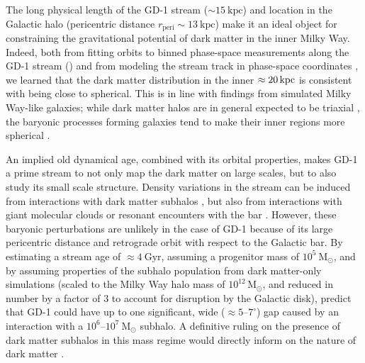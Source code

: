 \documentclass[modern]{aastex62}
\newcommand{\msun}{\textrm{M}_\odot}
\newcommand{\kpc}{\textrm{kpc}}
\begin{document}
The long physical length of the GD-1 stream ($\sim 15~\kpc$) and location in the
Galactic halo (pericentric distance $r_\textrm{peri} \sim 13~\kpc$) make it an
ideal object for constraining the gravitational potential of dark matter in the
inner Milky Way.
Indeed, both from fitting orbits to binned phase-space measurements along the
GD-1 stream (\citealt{Koposov:2010}) and from modeling the stream track in
phase-space coordinates \citep{Bowden:2015, Bovy:2016}, we learned that the
dark matter distribution in the inner $\approx20\,\rm kpc$ is consistent with being close to
spherical.
This is in line with findings from simulated Milky Way-like galaxies; while dark matter halos are in general expected to be triaxial \citep{Allgood:2006}, the baryonic processes forming galaxies tend to make their inner regions more spherical \citep{Zhu:2016}.

An implied old dynamical age, combined with its orbital properties, makes GD-1 a prime stream to not only map the dark matter on large scales, but to also study its small scale structure.
Density variations in the stream can be induced from interactions with dark matter subhalos \citep[e.g.,][]{Ngan:2014}, but also from interactions with giant molecular clouds \citep{Amorisco:2016} or resonant encounters with the bar \citep{Pearson:2017}.
However, these baryonic perturbations are unlikely in the case of GD-1 because of its large pericentric distance and retrograde orbit with respect to
the Galactic bar.
By estimating a stream age of $\approx 4~\textrm{Gyr}$, assuming a progenitor
mass of $10^5~\msun$, and by assuming properties of the subhalo population from dark matter-only simulations \citep{Springel:2008, Diemand:2008} (scaled to the Milky Way halo mass of $10^{12}\,\msun$, and reduced in number by a factor of 3 to account for disruption by the Galactic disk), \citet{Erkal:2016} predict that GD-1 could have up to one significant, wide
($\approx 5$--$7^\circ$) gap caused by an interaction with a
$10^6$--$10^7~\msun$ subhalo.
A definitive ruling on the presence of dark matter subhalos in this mass regime would directly inform on the nature of dark matter \citep[e.g.][]{Bullock:2017}.
\end{document}
